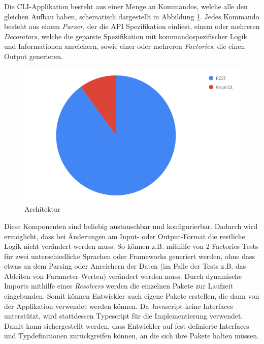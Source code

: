 Die CLI-Applikation besteht aus einer Menge an Kommandos, welche alle den gleichen Aufbau haben, schematisch dargestellt in Abbildung \ref{fig:architecture}. Jedes Kommando besteht aus einem \emph{Parser}, der die API Spezifikation einliest, einem oder mehreren \emph{Decorators}, welche die geparste Spezifikation mit kommandospezifischer Logik und Informationen anreichern, sowie einer oder mehreren \emph{Factories}, die einen Output generieren. \\

\begin{figure}[H]
\centering
  \includegraphics[width=\textwidth]{../images/architecture.png}
  \caption{Architektur}
  \label{fig:architecture}
\end{figure}

Diese Komponenten sind beliebig austauschbar und konfigurierbar. Dadurch wird ermöglicht, dass bei Änderungen am Input- oder Output-Format die restliche Logik nicht verändert werden muss. So können z.B. mithilfe von 2 Factories Tests für zwei unterschiedliche Sprachen oder Frameworks generiert werden, ohne dass etwas an dem Parsing oder Anreichern der Daten (im Falle der Tests z.B. das Ableiten von Parameter-Werten) verändert werden muss. Durch dynamische Imports mithilfe eines \emph{Resolvers} werden die einzelnen Pakete zur Laufzeit eingebunden. Somit können Entwickler auch eigene Pakete erstellen, die dann von der Applikation verwendet werden können. Da Javascript keine Interfaces unterstützt, wird stattdessen Typescript für die Implementierung verwendet. Damit kann sichergestellt werden, dass Entwickler auf fest definierte Interfaces und Typdefinitionen zurückgreifen können, an die sich ihre Pakete halten müssen. 



